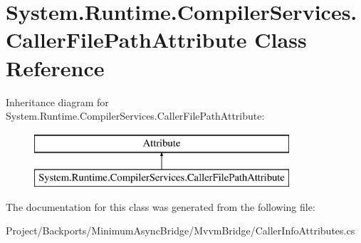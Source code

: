 \hypertarget{class_system_1_1_runtime_1_1_compiler_services_1_1_caller_file_path_attribute}{}\section{System.\+Runtime.\+Compiler\+Services.\+Caller\+File\+Path\+Attribute Class Reference}
\label{class_system_1_1_runtime_1_1_compiler_services_1_1_caller_file_path_attribute}
Inheritance diagram for System.\+Runtime.\+Compiler\+Services.\+Caller\+File\+Path\+Attribute\+:\begin{figure}[H]
\begin{center}
\leavevmode
\includegraphics[height=2.000000cm]{class_system_1_1_runtime_1_1_compiler_services_1_1_caller_file_path_attribute}
\end{center}
\end{figure}


The documentation for this class was generated from the following file\+:\begin{DoxyCompactItemize}
\item 
Project/\+Backports/\+Minimum\+Async\+Bridge/\+Mvvm\+Bridge/Caller\+Info\+Attributes.\+cs\end{DoxyCompactItemize}
